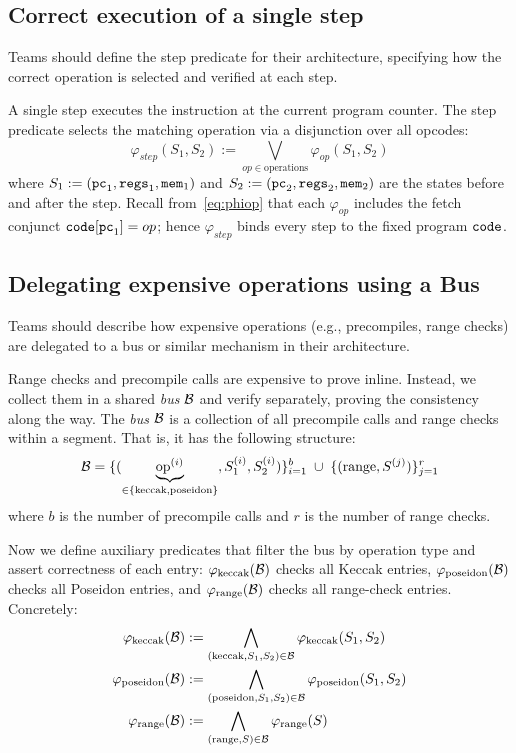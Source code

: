 \subsection{Correct execution of a single step}

\begin{instruction}
Teams should define the step predicate for their architecture, specifying how the correct operation is selected and verified at each step.
\end{instruction}

A single step executes the instruction at the current program counter.
The step predicate selects the matching operation via a disjunction over all opcodes:
\begin{equation*}\label{eq:step}
\varphi_{step}(S_1,S_2):=
\bigvee_{op\in \text{operations}} \varphi_{op}(S_1,S_2)
\end{equation*}
where $S_1:=(\mathtt{pc}_1,\mathtt{regs}_1,\mathtt{mem}_1)$ and $S_2:=(\mathtt{pc}_2,\mathtt{regs}_2,\mathtt{mem}_2)$ are the states before and after the step.
Recall from~\eqref{eq:phiop} that each $\varphi_{op}$ includes the fetch conjunct
$\mathtt{code}[\mathtt{pc}_1]=op$; hence $\varphi_{step}$ binds every step to the fixed program $\mathtt{code}$.

\subsection{Delegating expensive operations using a Bus}

\begin{instruction}
Teams should describe how expensive operations (e.g., precompiles, range checks) are delegated to a bus or similar mechanism in their architecture.
\end{instruction}

Range checks and precompile calls are expensive to prove inline.
Instead, we collect them in a shared \emph{bus} $\mathcal{B}$
and verify separately, proving the consistency along the way.
The \emph{bus} $\mathcal{B}$ is a collection of  all
precompile calls and range checks within a segment. That is, it has the following structure:
$$
\mathcal{B}=\{(\underbrace{\mathrm{op}^{(i)}}_{\in\{\mathrm{keccak},\mathrm{poseidon}\}},
S_1^{(i)},S_2^{(i)})\}_{i=1}^{b}\;\cup\;
\{(\mathrm{range},S^{(j)} )\}_{j=1}^{r}
$$
where $b$ is the number of precompile calls and $r$ is the number of range checks.


Now we define auxiliary predicates that filter the bus by operation type
and assert correctness of each entry:
$\varphi_{\mathrm{\mathrm{keccak}}}(\mathcal{B})$ checks all Keccak entries,
$\varphi_{\mathrm{\mathrm{poseidon}}}(\mathcal{B})$ checks all Poseidon entries,
and $\varphi_{\mathrm{\mathrm{range}}}(\mathcal{B})$ checks all range-check entries.
Concretely:
\begin{align*}
\varphi_{\mathrm{\mathrm{keccak}}}(\mathcal{B})&:=
\bigwedge_{( \mathrm{keccak},S_1,S_2)\in\mathcal{B}}
\varphi_{\mathrm{keccak}}(S_1,S_2)\\
\varphi_{\mathrm{\mathrm{poseidon}}}(\mathcal{B})&:=
\bigwedge_{( \mathrm{poseidon},S_1,S_2)\in\mathcal{B}}
\varphi_{\mathrm{poseidon}}(S_1,S_2)\\
\varphi_{\mathrm{\mathrm{range}}}(\mathcal{B})&:=
\bigwedge_{( \mathrm{range},S)\in\mathcal{B}}
\varphi_{\mathrm{\mathrm{range}}}(S)
\end{align*}


